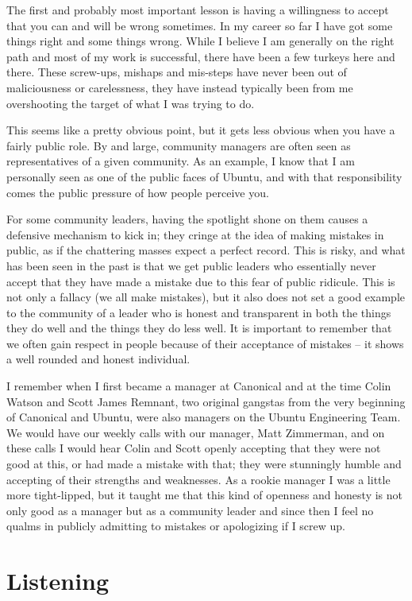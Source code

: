The first and probably most important lesson is having a willingness to accept that you can and will be wrong sometimes. In my career so far I have got some things right and some things wrong. While I believe I am generally on the right path and most of my work is successful, there have been a few turkeys here and there. These screw-ups, mishaps and mis-steps have never been out of maliciousness or carelessness, they have instead typically been from me overshooting the target of what I was trying to do.

This seems like a pretty obvious point, but it gets less obvious when you have a fairly public role. By and large, community managers are often seen as representatives of a given community. As an example, I know that I am personally seen as one of the public faces of Ubuntu, and with that responsibility comes the public pressure of how people perceive you.

For some community leaders, having the spotlight shone on them causes a defensive mechanism to kick in; they cringe at the idea of making mistakes in public, as if the chattering masses expect a perfect record. This is risky, and what has been seen in the past is that we get public leaders who essentially never accept that they have made a mistake due to this fear of public ridicule. This is not only a fallacy (we all make mistakes), but it also does not set a good example to the community of a leader who is honest and transparent in both the things they do well and the things they do less well. It is important to remember that we often gain respect in people because of their acceptance of mistakes -- it shows a well rounded and honest individual.

I remember when I first became a manager at Canonical and at the time Colin Watson and Scott James Remnant, two original gangstas from the very beginning of Canonical and Ubuntu, were also managers on the Ubuntu Engineering Team. We would have our weekly calls with our manager, Matt Zimmerman, and on these calls I would hear Colin and Scott openly accepting that they were not good at this, or had made a mistake with that; they were stunningly humble and accepting of their strengths and weaknesses. As a rookie manager I was a little more tight-lipped, but it taught me that this kind of openness and honesty is not only good as a manager but as a community leader and since then I feel no qualms in publicly admitting to mistakes or apologizing if I screw up.

\section*{Listening}

